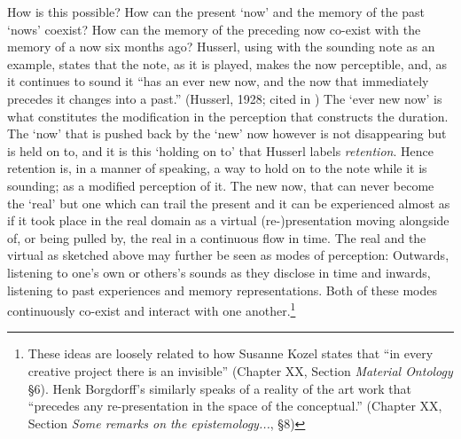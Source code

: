 How is this possible? How can the present `now' and the memory of the past `nows' coexist? How can the memory of the preceding now co-exist with the memory of a now six months ago? Husserl, using with the sounding note as an example, states that the note, as it is played, makes the now perceptible, and, as it continues to sound it ``has an ever new now, and the now that immediately precedes it changes into a past.'' (Husserl, 1928; cited in \citealt[32]{ricoeur04}) The `ever new now' is what constitutes the modification in the perception that constructs the duration. The `now' that is pushed back by the `new' now however is not disappearing but is held on to, and it is this `holding on to' that Husserl labels \emph{retention}. \citep[32]{ricoeur04} Hence retention is, in a manner of speaking, a way to hold on to the note while it is sounding; as a modified perception of it. %
The new now, that can never become the `real' but one which can trail the present and it can be experienced almost as if it took place in the real domain as a virtual (re-)presentation moving alongside of, or being pulled by, the real in a continuous flow in time. The real and the virtual as sketched above may further be seen as modes of perception: Outwards, listening to one's own or others's sounds as they disclose in time and inwards, listening to past experiences and memory representations. Both of these modes continuously co-exist and interact with one another.\footnote{These ideas are loosely related to how Susanne Kozel states that ``in every creative project there is an invisible'' (Chapter XX, Section \emph{Material Ontology} \S6). Henk Borgdorff's similarly speaks of a reality of the art work that ``precedes any re-presentation in the space of the conceptual.'' (Chapter XX, Section \emph{Some remarks on the epistemology...}, \S8)} 

